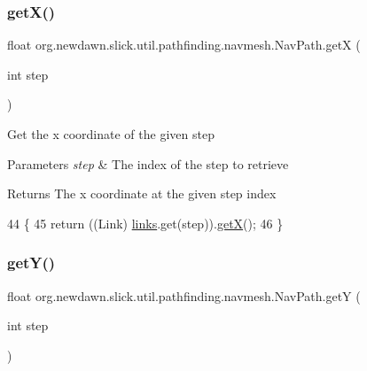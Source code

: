 \subsubsection{\texorpdfstring{get\+X()}{getX()}}
{\footnotesize\ttfamily float org.\+newdawn.\+slick.\+util.\+pathfinding.\+navmesh.\+Nav\+Path.\+getX (\begin{DoxyParamCaption}\item[{int}]{step }\end{DoxyParamCaption})\hspace{0.3cm}{\ttfamily [inline]}}

Get the x coordinate of the given step


\begin{DoxyParams}{Parameters}
{\em step} & The index of the step to retrieve \\
\hline
\end{DoxyParams}
\begin{DoxyReturn}{Returns}
The x coordinate at the given step index 
\end{DoxyReturn}

\begin{DoxyCode}
44                                 \{
45         \textcolor{keywordflow}{return} ((Link) \mbox{\hyperlink{classorg_1_1newdawn_1_1slick_1_1util_1_1pathfinding_1_1navmesh_1_1_nav_path_aa79523223a18486178fbb21fe550f253}{links}}.get(step)).\mbox{\hyperlink{classorg_1_1newdawn_1_1slick_1_1util_1_1pathfinding_1_1navmesh_1_1_nav_path_a7272c9ccd8f6bb478be3a4451e9d029f}{getX}}();
46     \}
\end{DoxyCode}
\mbox{\label{classorg_1_1newdawn_1_1slick_1_1util_1_1pathfinding_1_1navmesh_1_1_nav_path_a9070ea91900af3a0ba8a76b6a6067a08}} 
\subsubsection{\texorpdfstring{get\+Y()}{getY()}}
{\footnotesize\ttfamily float org.\+newdawn.\+slick.\+util.\+pathfinding.\+navmesh.\+Nav\+Path.\+getY (\begin{DoxyParamCaption}\item[{int}]{step }\end{DoxyParamCaption})\hspace{0.3cm}{\ttfamily [inline]}}

